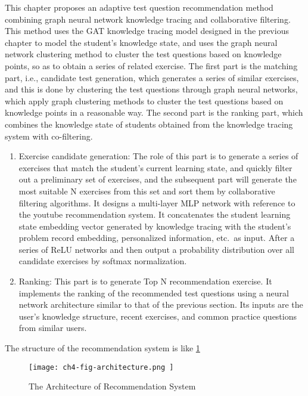 This chapter proposes an adaptive test question recommendation method combining graph neural network knowledge tracing and collaborative filtering. This method uses the GAT knowledge tracing model designed in the previous chapter to model the student's knowledge state, and uses the graph neural network clustering method to cluster the test questions based on knowledge points, so as to obtain a series of related exercise. The first part is the matching part, i.e., candidate test generation, which generates a series of similar exercises, and this is done by clustering the test questions through graph neural networks, which apply graph clustering methods to cluster the test questions based on knowledge points in a reasonable way. The second part is the ranking part, which combines the knowledge state of students obtained from the knowledge tracing system with co-filtering.
\begin{enumerate}
  \item Exercise candidate generation: The role of this part is to generate a series of exercises that match the student's current learning state, and quickly filter out a preliminary set of exercises, and the subsequent part will generate the most suitable N exercises from this set and sort them by collaborative filtering algorithms. It designs a multi-layer MLP network with reference to the youtube recommendation system. It concatenates the student learning state embedding vector generated by knowledge tracing with the student's problem record embedding, personalized information, etc.\ as input. After a series of ReLU networks and then output a probability distribution over all candidate exercises by softmax normalization.
  \item Ranking: This part is to generate Top N recommendation exercise. It implements the ranking of the recommended test questions using a neural network architecture similar to that of the previous section. Its inputs are the user's knowledge structure, recent exercises, and common practice questions from similar users.
\end{enumerate}

The structure of the recommendation system is like \figurename{\ref{fig:ch4-fig0}}

\begin{figure}[h]
  \centering
  \texttt{[image: ch4-fig-architecture.png ]}
  \caption{The Architecture of Recommendation System}\label{fig:ch4-fig0}
\end{figure}

